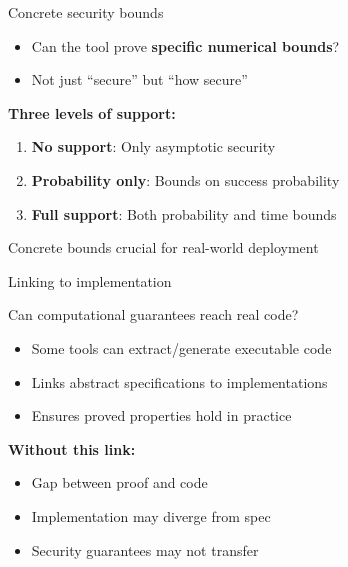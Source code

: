 \documentclass[aspectratio=169, lualatex, handout]{beamer}
\begin{document}
\begin{frame}{Concrete security bounds}
	\begin{itemize}
		\item Can the tool prove \textbf{specific numerical bounds}?
		\item Not just ``secure'' but ``how secure''
	\end{itemize}
	\vspace{0.5em}
	\textbf{Three levels of support:}
	\begin{enumerate}
		\item \textbf{No support}: Only asymptotic security
		\item \textbf{Probability only}: Bounds on success probability
		\item \textbf{Full support}: Both probability and time bounds
	\end{enumerate}
	\vspace{0.5em}
	\begin{center}
		Concrete bounds crucial for real-world deployment
	\end{center}
\end{frame}

\begin{frame}{Linking to implementation}
	\begin{center}
		\Large
		Can computational guarantees reach real code?
	\end{center}
	\vspace{1em}
	\begin{itemize}
		\item Some tools can extract/generate executable code
		\item Links abstract specifications to implementations
		\item Ensures proved properties hold in practice
	\end{itemize}
	\vspace{0.5em}
	\textbf{Without this link:}
	\begin{itemize}
		\item Gap between proof and code
		\item Implementation may diverge from spec
		\item Security guarantees may not transfer
	\end{itemize}
\end{frame}
\end{document}
